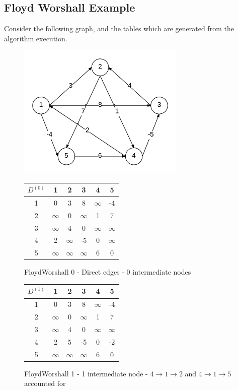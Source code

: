 \documentclass[12pt,letterpaper]{article}
\begin{document}
\subsection{Floyd Worshall Example}
Consider the following graph, and the tables which are generated from the algorithm execution.
\begin{figure}[h]
\centering
\includegraphics[width=8cm]{fwex}
\end{figure}
\begin{figure}[h]
\centering
\begin{tabular}{|c|c|c|c|c|c|} \hline
$D^{(0)}$&1&2&3&4&5\\ \hline \hline
1&0&3&8&$\infty$&-4\\ \hline
2&$\infty$&0&$\infty$&1&7\\ \hline
3&$\infty$&4&0&$\infty$&$\infty$\\ \hline
4&2&$\infty$&-5&0&$\infty$\\ \hline
5&$\infty$&$\infty$&$\infty$&6&0\\ \hline
\end{tabular}
\caption{FloydWorshall 0 - Direct edges - 0 intermediate nodes}
\end{figure}
\begin{figure}[h]
\centering
\begin{tabular}{|c|c|c|c|c|c|} \hline
$D^{(1)}$&1&2&3&4&5\\ \hline \hline
1&0&3&8&$\infty$&-4\\ \hline
2&$\infty$&0&$\infty$&1&7\\ \hline
3&$\infty$&4&0&$\infty$&$\infty$\\ \hline
4&2&5&-5&0&-2\\ \hline
5&$\infty$&$\infty$&$\infty$&6&0\\ \hline
\end{tabular}
\caption{FloydWorshall 1 - 1 intermediate node - $4\to 1 \to 2$ and $4\to 1 \to 5$ accounted for}
\end{figure}
\end{document}
